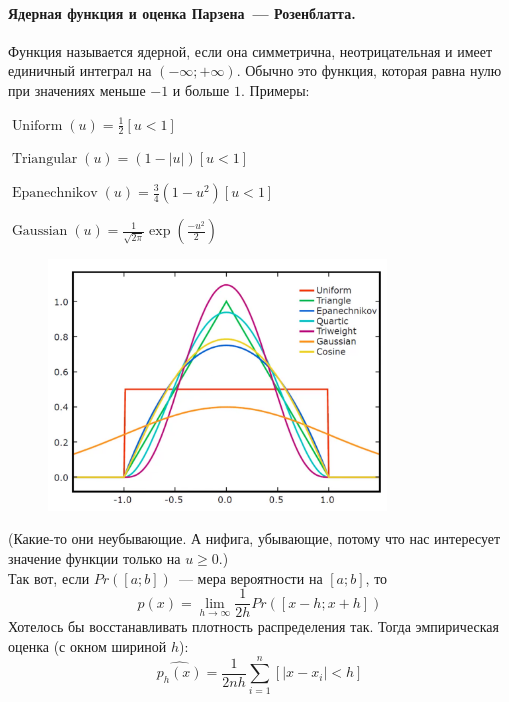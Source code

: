 \documentclass{article}
\begin{document}
    \paragraph{Ядерная функция и оценка Парзена~--- Розенблатта.}
    Функция называется ядерной, если она симметрична, неотрицательная и имеет единичный интеграл на $(-\infty;+\infty)$. Обычно это функция, которая равна нулю при значениях меньше $-1$ и больше $1$. Примеры:
    \begin{itemize}
        \begin{multicols}{2}
            \item $\displaystyle \operatorname{Uniform}(u)=\frac12[u<1]$
            \item $\displaystyle \operatorname{Triangular}(u)=(1-|u|)[u<1]$
            \columnbreak
            \item $\displaystyle \operatorname{Epanechnikov}(u)=\frac34(1-u^2)[u<1]$
            \item $\displaystyle \operatorname{Gaussian}(u)=\frac1{\sqrt{2\pi}}\exp\left(\frac{-u^2}2\right)$
        \end{multicols}
    \end{itemize}
    \begin{figure}[H]
        \includegraphics[width=0.8\textwidth]{Images/ml_kernel_functions}
    \end{figure}\noindent
    (Какие-то они неубывающие. А нифига, убывающие, потому что нас интересует значение функции только на $u\geqslant0$.)\\
    Так вот, если $Pr([a;b])$~--- мера вероятности на $[a;b]$, то
    \[
    p(x)=\lim\limits_{h\to\infty}\frac1{2h}Pr([x-h;x+h])
    \]
    Хотелось бы восстанавливать плотность распределения так. Тогда эмпирическая оценка (с окном шириной $h$):
    \[
    \widehat{p_h(x)}=\frac1{2nh}\sum\limits_{i=1}^n[|x-x_i|<h]
    \]
\end{document}
